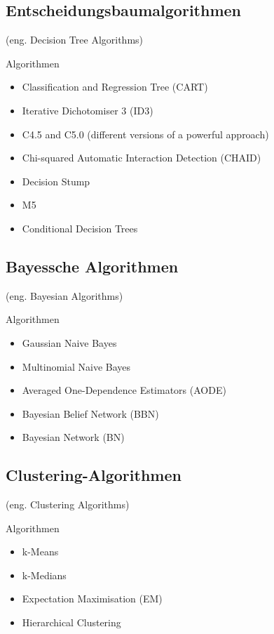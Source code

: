 \subsection{Entscheidungsbaumalgorithmen}
(eng. Decision Tree Algorithms)\vspace{0.2cm}

Algorithmen
\begin{itemize}
	\item Classification and Regression Tree (CART)
	\item Iterative Dichotomiser 3 (ID3)
	\item C4.5 and C5.0 (different versions of a powerful approach)
	\item Chi-squared Automatic Interaction Detection (CHAID)
	\item Decision Stump
	\item M5
	\item Conditional Decision Trees
\end{itemize}

\subsection{Bayessche Algorithmen}
(eng. Bayesian Algorithms)\vspace{0.2cm}

Algorithmen
\begin{itemize}
	\item Gaussian Naive Bayes
	\item Multinomial Naive Bayes
	\item Averaged One-Dependence Estimators (AODE)
	\item Bayesian Belief Network (BBN)
	\item Bayesian Network (BN)
\end{itemize}

\subsection{Clustering-Algorithmen}
(eng. Clustering Algorithms)\vspace{0.2cm}

Algorithmen
\begin{itemize}
	\item k-Means
	\item k-Medians
	\item Expectation Maximisation (EM)
	\item Hierarchical Clustering
\end{itemize}


